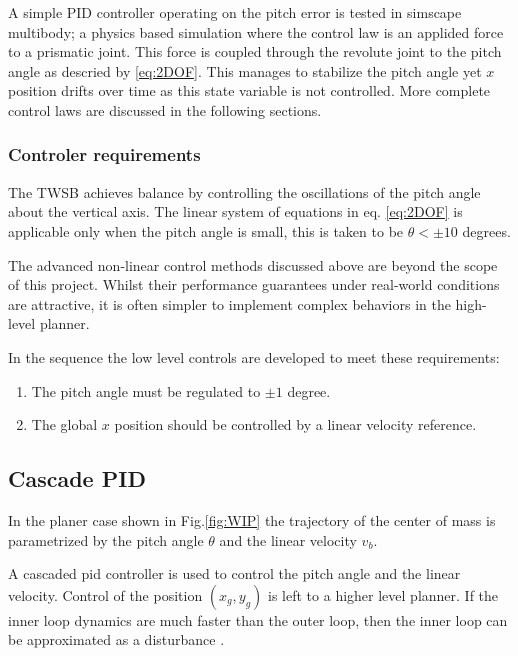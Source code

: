        A simple PID controller operating on the pitch error is tested in simscape multibody; 
        a physics based simulation where the control law is an applided force to a prismatic joint. 
        This force is coupled through the revolute joint to the pitch angle as descried by \ref{eq:2DOF}.
        This manages to stabilize the pitch angle yet $x$ position drifts over time as this 
        state variable is not controlled.
        More complete control laws are discussed in the following sections.


        \subsubsection{Controler requirements}

        The TWSB achieves balance by controlling the oscillations of the pitch angle about the 
        vertical axis. The linear system of equations in eq. \ref{eq:2DOF} is applicable 
        only when the pitch angle is small, this is taken to be $\theta < ±10$ degrees. 

        The advanced non-linear control methods discussed above are beyond the scope of this project. 
        Whilst their performance guarantees under real-world conditions are attractive, it is often simpler 
        to implement complex behaviors in the high-level planner.

        In the sequence the low level controls are developed to meet these requirements:
        \begin{enumerate}
            \item The pitch angle must be regulated to $±1$ degree.
            \item The global $x$ position should be controlled by a linear velocity reference.
        \end{enumerate}

        \subsection{Cascade PID}
        
        In the planer case shown in Fig.\ref{fig:WIP} the trajectory of the center of mass is parametrized by 
        the pitch angle $\theta$ and the linear velocity $v_b$. 
    
        A cascaded pid controller is used to control the pitch angle and the linear velocity. 
        Control of the position $(x_g,y_g)$ is left to a higher level planner.  
        If the inner loop dynamics are much faster than the outer loop, 
        then the inner loop can be approximated as a disturbance \cite{Robust2DofPID}.

